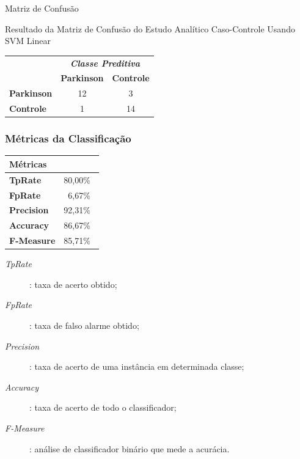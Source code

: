 \documentclass{beamer}
\begin{document}
\begin{frame}{Matriz de Confusão}
	\begin{block}{Resultado da Matriz de Confusão do Estudo Analítico Caso-Controle Usando SVM Linear}
\begin{table}[!htbp]
		\label{table:resultadomatrizconfusaosvm}
		\centering
		\begin{tabular}{l|c|c|}
		\cline{2-3}
		\multicolumn{1}{c}{}                         & \multicolumn{2}{|c|}{\textit{\textbf{Classe Preditiva}}} \\ \cline{2-3} 
																								 & \textbf{Parkinson}      & \textbf{Controle}         \\ \hline
		\multicolumn{1}{|l|}{\textbf{Parkinson}} & 12       & 3           \\ \hline
		\multicolumn{1}{|l|}{\textbf{Controle}}     & 1           & 14     \\ \hline
		\end{tabular}
\end{table}
	\end{block}
\end{frame}

\begin{frame}
   \frametitle{Métricas da Classificação}
   \begin{block}{}
   		\begin{table}[!htbp]
				\label{table:metricasmatrizconfusao}
				\centering
				\begin{tabular}{|l|r|}
				\hline
				\multicolumn{2}{|l|}{\textbf{Métricas}} \\ \hline
				\textbf{TpRate}                    & 80,00$\%$\                 \\ \hline
				\textbf{FpRate}                    & 6,67$\%$\                \\ \hline
				\textbf{Precision}                 & 92,31$\%$\                \\ \hline
				\textbf{Accuracy}                  & 86,67$\%$\                \\ \hline
				\textbf{F-Measure}                 & 85,71$\%$\                \\ \hline
				\end{tabular}
				\end{table}
	\end{block}
     \begin{block}{}
				\begin{description}
				\item [\textit{TpRate}]: taxa de acerto obtido;
				\item [\textit{FpRate}]: taxa de falso alarme obtido;
				\item [\textit{Precision}]: taxa de acerto de uma instância em determinada classe;
				\item [\textit{Accuracy}]: taxa de acerto de todo o classificador;
				\item [\textit{F-Measure}]: análise de classificador binário que mede a acurácia.
				\end{description}
    \end{block}
\end{frame}
\end{document}
